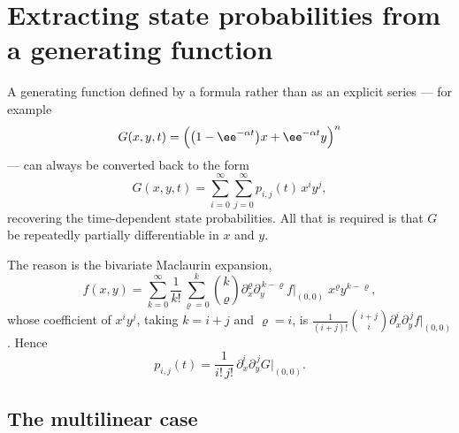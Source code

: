 \section{Extracting state probabilities from a generating function}
\label{m:app:extract}

A generating function defined by a formula rather than as an explicit series --- for
example
\begin{equation}
\label{m:eq:examplePgf}
G(x,y,t) = \Bigl(\bigl(1-\ee^{-\alpha t}\bigr)x + \ee^{-\alpha t}y\Bigr)^n
\end{equation}
--- can always be converted back to the form
\begin{equation}
\label{m:eq:series1}
G(x,y,t) = \sum_{i=0}^{\infty}\sum_{j=0}^{\infty}p_{i,j}(t)\,x^iy^j ,
\end{equation}
recovering the time-dependent state probabilities. All that is required is that $G$
be repeatedly partially differentiable in $x$ and $y$.

The reason is the bivariate Maclaurin expansion,
\begin{equation*}
f(x,y) = \sum_{k=0}^{\infty}\frac{1}{k!}\sum_{\varrho=0}^{k}\binom{k}{\varrho}
\partial_x^{\varrho}\partial_y^{\,k-\varrho}f\Big|_{(0,0)}\;x^{\varrho}y^{k-\varrho},
\end{equation*}
whose coefficient of $x^iy^j$, taking $k=i+j$ and $\varrho=i$, is
$\frac{1}{(i+j)!}\binom{i+j}{i}\partial_x^i\partial_y^{\,j}f\big|_{(0,0)}$. Hence
\begin{equation}
\label{m:eq:stateProb}
p_{i,j}(t) = \frac{1}{i!\,j!}\,\partial_x^i\partial_y^{\,j}G\Big|_{(0,0)} .
\end{equation}

\subsection*{The multilinear case}


